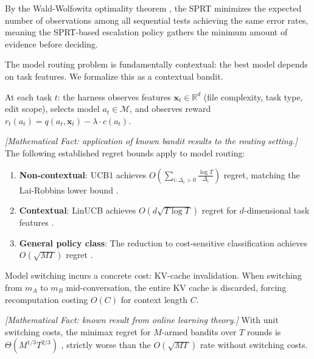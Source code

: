 By the Wald-Wolfowitz optimality theorem \citep{waldwolfowitz1948}, the SPRT minimizes the expected number of observations among all sequential tests achieving the same error rates, meaning the SPRT-based escalation policy gathers the minimum amount of evidence before deciding.

The model routing problem is fundamentally contextual: the best model depends on task features. We formalize this as a contextual bandit.

\begin{definition}
\label{def:routing-bandit}
At each task $t$: the harness observes features $\mathbf{x}_t \in \mathbb{R}^d$ (file complexity, task type, edit scope), selects model $a_t \in \mathcal{M}$, and observes reward $r_t(a_t) = q(a_t, \mathbf{x}_t) - \lambda \cdot c(a_t)$.
\end{definition}

\begin{proposition}
\emph{[Mathematical Fact: application of known bandit results to the routing setting.]}
\label{prop:routing-regret}
The following established regret bounds apply to model routing:
\begin{enumerate}[label=(\alph*), nosep]
\item \textbf{Non-contextual}: UCB1 achieves $O\left(\sum_{i: \Delta_i > 0} \frac{\log T}{\Delta_i}\right)$ regret, matching the Lai-Robbins lower bound \citep{auer2002, laiRobbins1985}.
\item \textbf{Contextual}: LinUCB achieves $O(d\sqrt{T \log T})$ regret for $d$-dimensional task features \citep{li2010linucb}.
\item \textbf{General policy class}: The reduction to cost-sensitive classification achieves $O(\sqrt{MT})$ regret \citep{agarwal2014monster}.
\end{enumerate}
\end{proposition}

Model switching incurs a concrete cost: KV-cache invalidation. When switching from $m_A$ to $m_B$ mid-conversation, the entire KV cache is discarded, forcing recomputation costing $O(C)$ for context length $C$.

\begin{theorem}
\emph{[Mathematical Fact: known result from online learning theory.]}
\label{thm:routing-switching}
With unit switching costs, the minimax regret for $M$-armed bandits over $T$ rounds is $\Theta(M^{1/3} T^{2/3})$ \citep{dekel2014switching}, strictly worse than the $O(\sqrt{MT})$ rate without switching costs.
\end{theorem}

